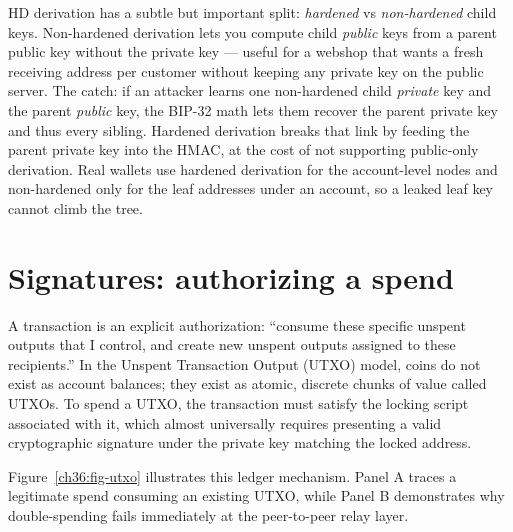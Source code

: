 \begin{applicationbox}
HD derivation has a subtle but important split: \emph{hardened} vs \emph{non-hardened} child keys. Non-hardened derivation lets you compute child \emph{public} keys from a parent public key without the private key --- useful for a webshop that wants a fresh receiving address per customer without keeping any private key on the public server. The catch: if an attacker learns one non-hardened child \emph{private} key and the parent \emph{public} key, the BIP-32 math lets them recover the parent private key and thus every sibling. Hardened derivation breaks that link by feeding the parent private key into the HMAC, at the cost of not supporting public-only derivation. Real wallets use hardened derivation for the account-level nodes and non-hardened only for the leaf addresses under an account, so a leaked leaf key cannot climb the tree.
\end{applicationbox}

\section{Signatures: authorizing a spend}
\label{ch36:signatures}

A transaction is an explicit authorization: ``consume these specific unspent outputs that I control, and create new unspent outputs assigned to these recipients.'' In the Unspent Transaction Output (UTXO) model, coins do not exist as account balances; they exist as atomic, discrete chunks of value called UTXOs. To spend a UTXO, the transaction must satisfy the locking script associated with it, which almost universally requires presenting a valid cryptographic signature under the private key matching the locked address.

Figure~\ref{ch36:fig-utxo} illustrates this ledger mechanism. Panel A traces a legitimate spend consuming an existing UTXO, while Panel B demonstrates why double-spending fails immediately at the peer-to-peer relay layer.

